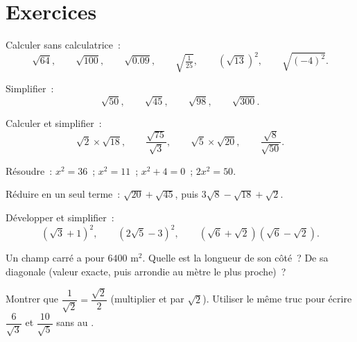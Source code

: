 \section{Exercices}

\begin{exercise}[$\star$]\label{exo:g9:sqrt:1}
Calculer sans calculatrice~:
\[
\sqrt{64}, \qquad \sqrt{100}, \qquad \sqrt{0.09}, \qquad
\sqrt{\tfrac{1}{25}}, \qquad \left(\sqrt{13}\right)^2, \qquad
\sqrt{(-4)^2} .
\]
\end{exercise}

\begin{exercise}[$\star$]\label{exo:g9:sqrt:2}
Simplifier~:
\[
\sqrt{50}, \qquad \sqrt{45}, \qquad \sqrt{98}, \qquad \sqrt{300} .
\]
\end{exercise}

\begin{exercise}[$\star$]\label{exo:g9:sqrt:3}
Calculer et simplifier~:
\[
\sqrt2 \times \sqrt{18}, \qquad
\frac{\sqrt{75}}{\sqrt3}, \qquad
\sqrt5 \times \sqrt{20}, \qquad
\frac{\sqrt{8}}{\sqrt{50}} .
\]
\end{exercise}

\begin{exercise}[$\star$]\label{exo:g9:sqrt:4}
Résoudre~: $x^2 = 36$~; \quad $x^2 = 11$~; \quad $x^2 + 4 = 0$~; \quad
$2x^2 = 50$.
\end{exercise}

\begin{exercise}[$\star$]\label{exo:g9:sqrt:5}
Réduire en un seul terme~: $\sqrt{20} + \sqrt{45}$, puis
$3\sqrt8 - \sqrt{18} + \sqrt2$.
\end{exercise}

\begin{exercise}[$\star\star$]\label{exo:g9:sqrt:6}
Développer et simplifier~:
\[
\left(\sqrt3 + 1\right)^2, \qquad
\left(2\sqrt5 - 3\right)^2, \qquad
\left(\sqrt6 + \sqrt2\right)\left(\sqrt6 - \sqrt2\right).
\]
\end{exercise}

\begin{exercise}[$\star\star$]\label{exo:g9:sqrt:7}
Un champ carré a pour  $6400$ m$^2$. Quelle est la longueur de son
côté~? De sa diagonale (valeur exacte, puis arrondie au mètre le plus
proche)~?
\end{exercise}

\begin{exercise}[$\star\star$]\label{exo:g9:sqrt:8}
Montrer que $\dfrac{1}{\sqrt2} = \dfrac{\sqrt2}{2}$ (multiplier
 et  par $\sqrt2$). Utiliser le même truc pour
écrire $\dfrac{6}{\sqrt3}$ et $\dfrac{10}{\sqrt5}$ sans  au
.
\end{exercise}

